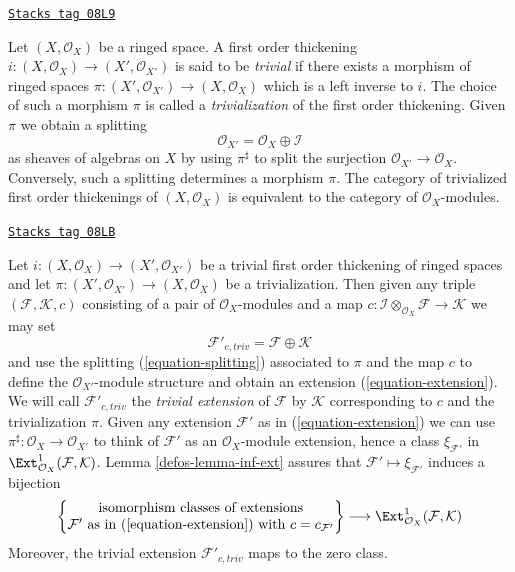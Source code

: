 \begin{remark}
\label{defos-remark-trivial-thickening}
\href{https://stacks.math.columbia.edu/tag/08L9}{\texttt{Stacks tag 08L9}}

Let $(X, \mathcal{O}_X)$ be a ringed space. A first order thickening
$i : (X, \mathcal{O}_X) \to (X', \mathcal{O}_{X'})$ is said
to be {\it trivial} if there exists a morphism of ringed spaces
$\pi : (X', \mathcal{O}_{X'}) \to (X, \mathcal{O}_X)$ which is a
left inverse to $i$. The choice of such a morphism
$\pi$ is called a {\it trivialization} of the first order thickening.
Given $\pi$ we obtain a splitting
\begin{equation}
\label{equation-splitting}
\mathcal{O}_{X'} = \mathcal{O}_X \oplus \mathcal{I}
\end{equation}
as sheaves of algebras on $X$ by using $\pi^\sharp$ to split the surjection
$\mathcal{O}_{X'} \to \mathcal{O}_X$. Conversely, such a splitting determines
a morphism $\pi$. The category of trivialized first order thickenings of
$(X, \mathcal{O}_X)$ is equivalent to the category of
$\mathcal{O}_X$-modules.
\end{remark}

\begin{remark}
\label{defos-remark-trivial-extension}
\href{https://stacks.math.columbia.edu/tag/08LB}{\texttt{Stacks tag 08LB}}

Let $i : (X, \mathcal{O}_X) \to (X', \mathcal{O}_{X'})$
be a trivial first order thickening of ringed spaces
and let $\pi : (X', \mathcal{O}_{X'}) \to (X, \mathcal{O}_X)$
be a trivialization. Then given any triple
$(\mathcal{F}, \mathcal{K}, c)$ consisting of a pair of
$\mathcal{O}_X$-modules and a map
$c : \mathcal{I} \otimes_{\mathcal{O}_X} \mathcal{F} \to \mathcal{K}$
we may set
$$
\mathcal{F}'_{c, triv} = \mathcal{F} \oplus \mathcal{K}
$$
and use the splitting (\ref{equation-splitting}) associated to $\pi$
and the map $c$ to define the $\mathcal{O}_{X'}$-module structure
and obtain an extension (\ref{equation-extension}). We will call
$\mathcal{F}'_{c, triv}$ the {\it trivial extension} of $\mathcal{F}$
by $\mathcal{K}$ corresponding
to $c$ and the trivialization $\pi$. Given any extension
$\mathcal{F}'$ as in (\ref{equation-extension}) we can use
$\pi^\sharp : \mathcal{O}_X \to \mathcal{O}_{X'}$ to think of $\mathcal{F}'$
as an $\mathcal{O}_X$-module extension, hence a class $\xi_{\mathcal{F}'}$
in $\Ext^1_{\mathcal{O}_X}(\mathcal{F}, \mathcal{K})$.
Lemma \ref{defos-lemma-inf-ext} assures that
$\mathcal{F}' \mapsto \xi_{\mathcal{F}'}$
induces a bijection
$$
\left\{
\begin{matrix}
\text{isomorphism classes of extensions}\\
\mathcal{F}'\text{ as in (\ref{equation-extension}) with }c = c_{\mathcal{F}'}
\end{matrix}
\right\}
\longrightarrow
\Ext^1_{\mathcal{O}_X}(\mathcal{F}, \mathcal{K})
$$
Moreover, the trivial extension $\mathcal{F}'_{c, triv}$ maps to the zero class.
\end{remark}

